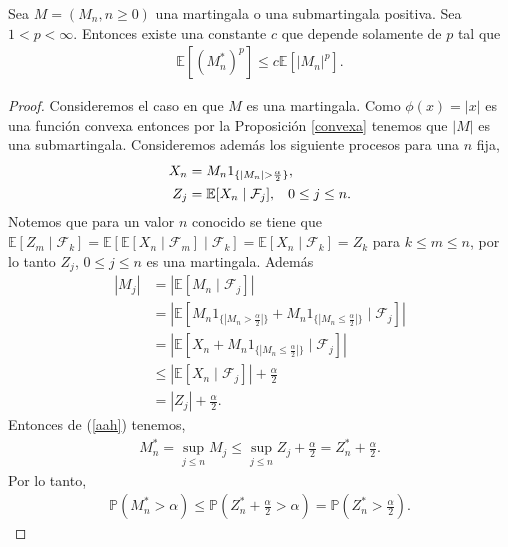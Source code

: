 \begin{theorem}
\label{lp}
	Sea $M = (M_n, n \geq 0)$ una martingala o una submartingala positiva. Sea $1 < p < \infty$. Entonces existe una constante $c$ que depende solamente de $p$ tal que
	\begin{align*}
		\mathbb{E}[(M_n^{*})^p] \leq c\mathbb{E}[|M_n|^p].
	\end{align*}
\end{theorem}
\begin{proof}
	Consideremos el caso en que $M$ es una martingala. Como $\phi(x) = |x|$ es una función convexa entonces por la Proposición \ref{convexa} tenemos que $|M|$ es una submartingala. Consideremos además los siguiente procesos para una $n$ fija,
	\begin{align*}
		X_n & = M_n1_{\{|M_n| > \frac{\alpha}{2} \} }, \\
		Z_j & = \mathbb{E}[X_n \mid \mathcal{F}_j], \hspace{0.3cm} 0 \leq j \leq n.
	\end{align*}
	Notemos que para un valor $n$ conocido se tiene que $\mathbb{E}[Z_m \mid \mathcal{F}_k] = \mathbb{E}[\mathbb{E}[X_n \mid \mathcal{F}_m] \mid \mathcal{F}_k] = \mathbb{E}[X_n \mid \mathcal{F}_k] = Z_k$ para $k \leq m \leq n$, por lo tanto $Z_j$, $0 \leq j \leq n$ es una martingala. Además
	\begin{align}
		|M_j| & = |\mathbb{E}[M_n \mid \mathcal{F}_j]| \nonumber \\
		& = \left|\mathbb{E}\left[ M_n 1_{\{|M_n > \frac{\alpha}{2}|\}} + M_n 1_{\{|M_n \leq \frac{\alpha}{2}|\}} \mid \mathcal{F}_j \right] \right| \nonumber \\
		& = \left| \mathbb{E}\left[X_n + M_n 1_{\{|M_n \leq \frac{\alpha}{2}|\}} \mid \mathcal{F}_j \right] \right| \nonumber \\
		& \leq \left| \mathbb{E}\left[ X_n \mid \mathcal{F}_j \right] \right| + \frac{\alpha}{2} \nonumber \\
		& = |Z_j| + \frac{\alpha}{2}. \label{aah}
	\end{align}
	Entonces de (\ref{aah}) tenemos, 
	\begin{align*}
		M_n^{*} = \sup_{j \leq n} M_j \leq \sup_{j \leq n} Z_j + \frac{\alpha}{2} = Z_n^{*} + \frac{\alpha}{2}.
	\end{align*}
	Por lo tanto, 
	\begin{align}
		\mathbb{P}(M_n^{*} > \alpha) \leq \mathbb{P}(Z_n^{*} + \frac{\alpha}{2} > \alpha) =  \mathbb{P}(Z_n^{*} > \frac{\alpha}{2}). \label{aai}

\end{align}
\end{proof}

